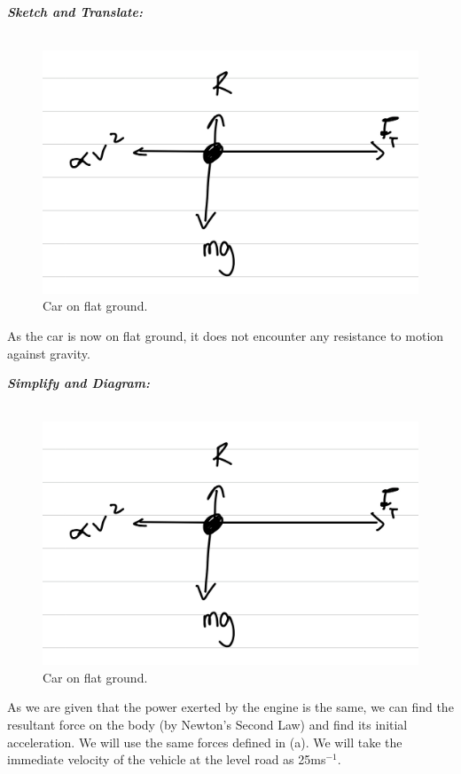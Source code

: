 \begin{subquestions}
\begin{subsubquestions}
	
\subsubquestion

\textbf{\textit{Sketch and Translate:}} \\ \\
\begin{figure}[H]
	\begin{center}
		\includegraphics[scale=0.25]{../2009/figures/2009q5-2}
		\caption{\label{2009:q5:Sketch2} Car on flat ground.}
	\end{center}
\end{figure}	
As the car is now on flat ground, it does not encounter any resistance to motion against gravity.




\textbf{\textit{Simplify and Diagram:}} \\ \\
\begin{figure}[H]
	\begin{center}
		\includegraphics[scale=0.25]{../2009/figures/2009q5-2}
		\caption{\label{2009:q5:Diagram2} Car on flat ground.}
	\end{center}
\end{figure}	
As we are given that the power exerted by the engine is the same, we can find the resultant force on the body (by Newton's Second Law) and find its initial acceleration. We will use the same forces defined in (a). We will take the immediate velocity of the vehicle at the level road as 25ms$^{-1}$.





\end{subsubquestions}
\end{subquestions}

